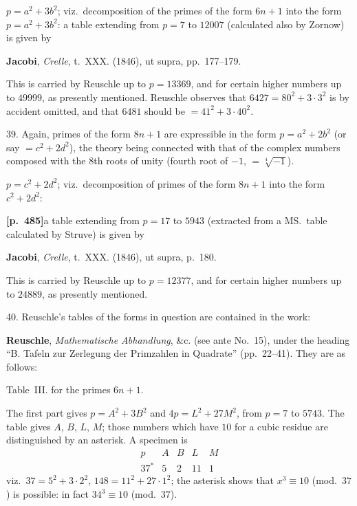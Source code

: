 \documentclass[11pt,a4paper]{article}
\begin{document}
$p = a^{2} + 3b^{2}$; viz.\ decomposition of the primes of the form $6n + 1$ into the form $p = a^{2} + 3b^{2}$: a table extending from $p = 7$ to $12007$ (calculated also by Zornow) is given by

\textbf{Jacobi}, \textit{Crelle}, t.~XXX. (1846), ut supra, pp.~177--179.

This is carried by Reuschle up to $p = 13369$, and for certain higher numbers up to $49999$, as presently mentioned. Reuschle observes that $6427 = 80^{2} + 3 \cdot 3^{2}$ is by accident omitted, and that $6481$ should be $= 41^{2} + 3 \cdot 40^{2}$.

39. Again, primes of the form $8n + 1$ are expressible in the form $p = a^{2} + 2b^{2}$ (or say $= c^{2} + 2d^{2}$), the theory being connected with that of the complex numbers composed with the $8$th roots of unity (fourth root of $-1$, $= \sqrt[4]{-1}$).

$p = c^{2} + 2d^{2}$; viz.\ decomposition of primes of the form $8n + 1$ into the form $c^{2} + 2d^{2}$:

\noindent\textbf{[p.~485]}\quad a table extending from $p = 17$ to $5943$ (extracted from a MS.\ table calculated by Struve) is given by

\textbf{Jacobi}, \textit{Crelle}, t.~XXX. (1846), ut supra, p.~180.

This is carried by Reuschle up to $p = 12377$, and for certain higher numbers up to $24889$, as presently mentioned.

40. Reuschle's tables of the forms in question are contained in the work:

\textbf{Reuschle}, \textit{Mathematische Abhandlung}, \&c. (see ante No.~15), under the heading ``B. Tafeln zur Zerlegung der Primzahlen in Quadrate'' (pp.~22--41). They are as follows:

Table~III. for the primes $6n + 1$.

The first part gives $p = A^{2} + 3B^{2}$ and $4p = L^{2} + 27M^{2}$, from $p = 7$ to $5743$. The table gives $A$, $B$, $L$, $M$; those numbers which have $10$ for a cubic residue are distinguished by an asterisk. A specimen is
\[
\begin{array}{c|cccc}
p & A & B & L & M \\
\hline
37^{*} & 5 & 2 & 11 & 1
\end{array}
\]
viz.\ $37 = 5^{2} + 3 \cdot 2^{2}$, $148 = 11^{2} + 27 \cdot 1^{2}$; the asterisk shows that $x^{3} \equiv 10$ (mod.~$37$) is possible: in fact $34^{3} \equiv 10$ (mod.~$37$).
\end{document}
